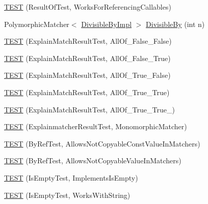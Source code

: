 \begin{DoxyCompactItemize}
\item 
\mbox{\hyperlink{namespacetesting_1_1gmock__matchers__test_a00ee08657c9e9e0c306be7b84cd2848c}{T\+E\+ST}} (Result\+Of\+Test, Works\+For\+Referencing\+Callables)
\item 
Polymorphic\+Matcher$<$ \mbox{\hyperlink{classtesting_1_1gmock__matchers__test_1_1DivisibleByImpl}{Divisible\+By\+Impl}} $>$ \mbox{\hyperlink{namespacetesting_1_1gmock__matchers__test_ac5b1fd3b6a8141c7e83ef6040ed4630f}{Divisible\+By}} (int n)
\item 
\mbox{\hyperlink{namespacetesting_1_1gmock__matchers__test_aa9a60a406d9f495de8c8552abf577dd1}{T\+E\+ST}} (Explain\+Match\+Result\+Test, All\+Of\+\_\+\+False\+\_\+\+False)
\item 
\mbox{\hyperlink{namespacetesting_1_1gmock__matchers__test_a099aebb5417d5bd85e11aefe935ec345}{T\+E\+ST}} (Explain\+Match\+Result\+Test, All\+Of\+\_\+\+False\+\_\+\+True)
\item 
\mbox{\hyperlink{namespacetesting_1_1gmock__matchers__test_a5d386691eaed59994a1d2b65f94b23a9}{T\+E\+ST}} (Explain\+Match\+Result\+Test, All\+Of\+\_\+\+True\+\_\+\+False)
\item 
\mbox{\hyperlink{namespacetesting_1_1gmock__matchers__test_a16545b298640b253502d604f52ea95e2}{T\+E\+ST}} (Explain\+Match\+Result\+Test, All\+Of\+\_\+\+True\+\_\+\+True)
\item 
\mbox{\hyperlink{namespacetesting_1_1gmock__matchers__test_af1ba4010a24716a51a302f9a518023b5}{T\+E\+ST}} (Explain\+Match\+Result\+Test, All\+Of\+\_\+\+True\+\_\+\+True\+\_)
\item 
\mbox{\hyperlink{namespacetesting_1_1gmock__matchers__test_a102b10d9064f6e0037e3f3f0c3e76e22}{T\+E\+ST}} (Explainmatcher\+Result\+Test, Monomorphic\+Matcher)
\item 
\mbox{\hyperlink{namespacetesting_1_1gmock__matchers__test_aab82f120c70dc7d8bc2fd74ac6897486}{T\+E\+ST}} (By\+Ref\+Test, Allows\+Not\+Copyable\+Const\+Value\+In\+Matchers)
\item 
\mbox{\hyperlink{namespacetesting_1_1gmock__matchers__test_a5ed7b822889a34f018c2ba8f21941fd4}{T\+E\+ST}} (By\+Ref\+Test, Allows\+Not\+Copyable\+Value\+In\+Matchers)
\item 
\mbox{\hyperlink{namespacetesting_1_1gmock__matchers__test_ab63796f77c7572f6f1aef01cb140f99e}{T\+E\+ST}} (Is\+Empty\+Test, Implements\+Is\+Empty)
\item 
\mbox{\hyperlink{namespacetesting_1_1gmock__matchers__test_a22f0cacccee169b7390741b9815f4281}{T\+E\+ST}} (Is\+Empty\+Test, Works\+With\+String)

\end{DoxyCompactItemize}
